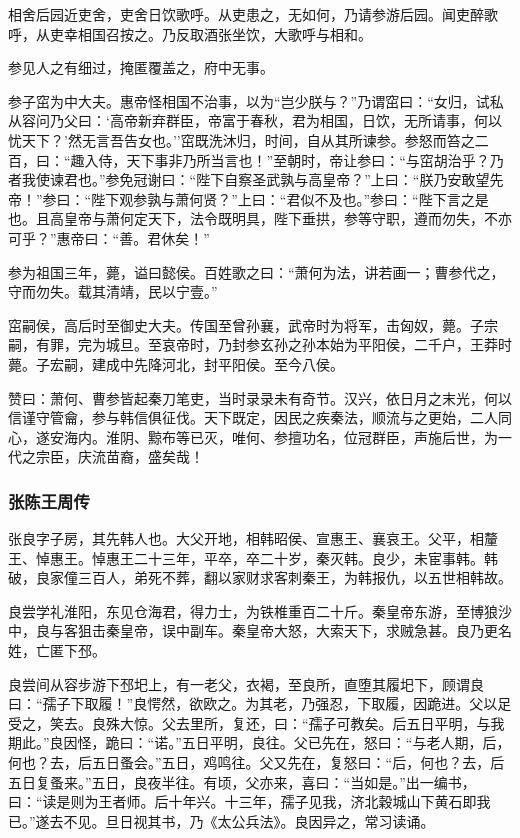 \documentclass[]{article}
\begin{document}
相舍后园近吏舍，吏舍日饮歌呼。从吏患之，无如何，乃请参游后园。闻吏醉歌呼，从吏幸相国召按之。乃反取酒张坐饮，大歌呼与相和。

参见人之有细过，掩匿覆盖之，府中无事。

参子窋为中大夫。惠帝怪相国不治事，以为``岂少朕与？''乃谓窋曰：``女归，试私从容问乃父曰：`高帝新弃群臣，帝富于春秋，君为相国，日饮，无所请事，何以忧天下？'然无言吾告女也。''窋既洗沐归，时间，自从其所谏参。参怒而笞之二百，曰：``趣入侍，天下事非乃所当言也！''至朝时，帝让参曰：``与窋胡治乎？乃者我使谏君也。''参免冠谢曰：``陛下自察圣武孰与高皇帝？''上曰：``朕乃安敢望先帝！''参曰：``陛下观参孰与萧何贤？''上曰：``君似不及也。''参曰：``陛下言之是也。且高皇帝与萧何定天下，法令既明具，陛下垂拱，参等守职，遵而勿失，不亦可乎？''惠帝曰：``善。君休矣！''

参为祖国三年，薨，谥曰懿侯。百姓歌之曰：``萧何为法，讲若画一；曹参代之，守而勿失。载其清靖，民以宁壹。''

窋嗣侯，高后时至御史大夫。传国至曾孙襄，武帝时为将军，击匈奴，薨。子宗嗣，有罪，完为城旦。至哀帝时，乃封参玄孙之孙本始为平阳侯，二千户，王莽时薨。子宏嗣，建成中先降河北，封平阳侯。至今八侯。

赞曰：萧何、曹参皆起秦刀笔吏，当时录录未有奇节。汉兴，依日月之末光，何以信谨守管龠，参与韩信俱征伐。天下既定，因民之疾秦法，顺流与之更始，二人同心，遂安海内。淮阴、黥布等已灭，唯何、参擅功名，位冠群臣，声施后世，为一代之宗臣，庆流苗裔，盛矣哉！

\hypertarget{header-n3761}{%
\subsubsection{张陈王周传}\label{header-n3761}}

张良字子房，其先韩人也。大父开地，相韩昭侯、宣惠王、襄哀王。父平，相釐王、悼惠王。悼惠王二十三年，平卒，卒二十岁，秦灭韩。良少，未宦事韩。韩破，良家僮三百人，弟死不葬，翻以家财求客刺秦王，为韩报仇，以五世相韩故。

良尝学礼淮阳，东见仓海君，得力士，为铁椎重百二十斤。秦皇帝东游，至博狼沙中，良与客狙击秦皇帝，误中副车。秦皇帝大怒，大索天下，求贼急甚。良乃更名姓，亡匿下邳。

良尝间从容步游下邳圯上，有一老父，衣褐，至良所，直堕其履圯下，顾谓良曰：``孺子下取履！''良愕然，欲欧之。为其老，乃强忍，下取履，因跪进。父以足受之，笑去。良殊大惊。父去里所，复还，曰：``孺子可教矣。后五日平明，与我期此。''良因怪，跪曰：``诺。''五日平明，良往。父已先在，怒曰：``与老人期，后，何也？去，后五日蚤会。''五日，鸡鸣往。父又先在，复怒曰：``后，何也？去，后五日复蚤来。''五日，良夜半往。有顷，父亦来，喜曰：``当如是。''出一编书，曰：``读是则为王者师。后十年兴。十三年，孺子见我，济北穀城山下黄石即我已。''遂去不见。旦日视其书，乃《太公兵法》。良因异之，常习读诵。
\end{document}
